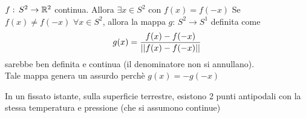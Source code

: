 \begin{cor}$f:\, S^2 \to \mathbb{R}^2$ continua. Allora $\exists x \in S^2 $ con $f(x)=f(-x)$
\proof Se $f(x)\neq f(-x)\, \, \forall x \in S^2$, allora la mappa $g:\, S^2 \to S^1$ definita come 
$$ g(x)=\frac{f(x)-f(-x)}{\left\vert\left\vert f(x)-f(-x) \right\vert \right\vert}$$ 
sarebbe ben definita e continua (il denominatore non si annullano).\\
Tale mappa genera un assurdo perch\`e $g(x)=-g(-x)$
\end{cor}
\begin{cor}In un fissato istante, sulla superficie terrestre, esistono 2 punti antipodali con la stessa temperatura e pressione (che si assumono continue)
\end{cor}
